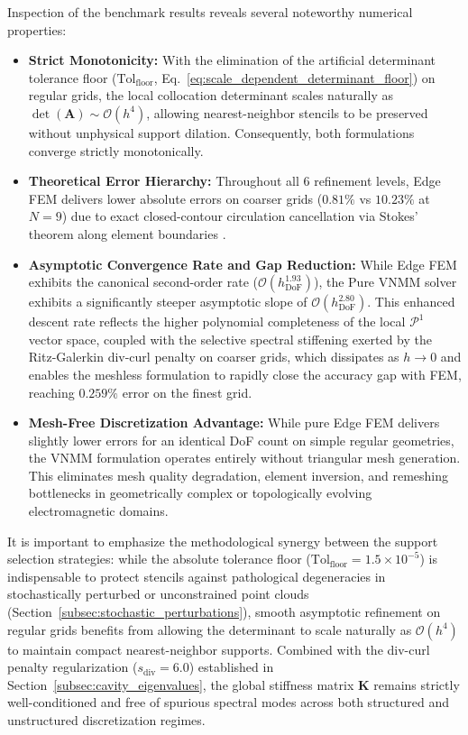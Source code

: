 \documentclass[preprint,12pt]{elsarticle}
\begin{document}
Inspection of the benchmark results reveals several noteworthy numerical properties:
\begin{itemize}
    \item \textbf{Strict Monotonicity:} With the elimination of the artificial determinant tolerance floor ($\mathrm{Tol}_{\mathrm{floor}}$, Eq.~\eqref{eq:scale_dependent_determinant_floor}) on regular grids, the local collocation determinant scales naturally as $\det(\mathbf{A}) \sim \mathcal{O}(h^4)$, allowing nearest-neighbor stencils to be preserved without unphysical support dilation. Consequently, both formulations converge strictly monotonically.
    \item \textbf{Theoretical Error Hierarchy:} Throughout all 6 refinement levels, Edge FEM delivers lower absolute errors on coarser grids ($0.81\%$ vs $10.23\%$ at $N=9$) due to exact closed-contour circulation cancellation via Stokes' theorem along element boundaries \cite{nedelec1980mixed, monk2003finite}.
    \item \textbf{Asymptotic Convergence Rate and Gap Reduction:} While Edge FEM exhibits the canonical second-order rate ($\mathcal{O}(h_{\mathrm{DoF}}^{1.93})$), the Pure VNMM solver exhibits a significantly steeper asymptotic slope of $\mathcal{O}(h_{\mathrm{DoF}}^{2.80})$. This enhanced descent rate reflects the higher polynomial completeness of the local $\mathcal{P}^1$ vector space, coupled with the selective spectral stiffening exerted by the Ritz-Galerkin div-curl penalty on coarser grids, which dissipates as $h \to 0$ and enables the meshless formulation to rapidly close the accuracy gap with FEM, reaching $0.259\%$ error on the finest grid.
    \item \textbf{Mesh-Free Discretization Advantage:} While pure Edge FEM delivers slightly lower errors for an identical DoF count on simple regular geometries, the VNMM formulation operates entirely without triangular mesh generation. This eliminates mesh quality degradation, element inversion, and remeshing bottlenecks in geometrically complex or topologically evolving electromagnetic domains.
\end{itemize}

It is important to emphasize the methodological synergy between the support selection strategies: while the absolute tolerance floor ($\mathrm{Tol}_{\mathrm{floor}} = 1.5 \times 10^{-5}$) is indispensable to protect stencils against pathological degeneracies in stochastically perturbed or unconstrained point clouds (Section~\ref{subsec:stochastic_perturbations}), smooth asymptotic refinement on regular grids benefits from allowing the determinant to scale naturally as $\mathcal{O}(h^4)$ to maintain compact nearest-neighbor supports. Combined with the div-curl penalty regularization ($s_{\mathrm{div}} = 6.0$) established in Section~\ref{subsec:cavity_eigenvalues}, the global stiffness matrix $\mathbf{K}$ remains strictly well-conditioned and free of spurious spectral modes across both structured and unstructured discretization regimes.
\end{document}
